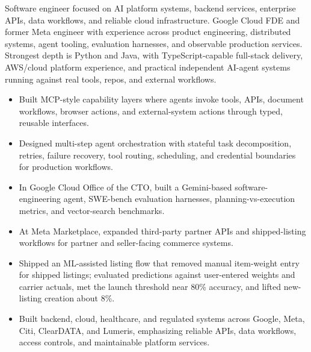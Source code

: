


Software engineer focused on AI platform systems, backend services, enterprise APIs, data workflows, and reliable cloud infrastructure. Google Cloud FDE and former Meta engineer with experience across product engineering, distributed systems, agent tooling, evaluation harnesses, and observable production services. Strongest depth is Python and Java, with TypeScript-capable full-stack delivery, AWS/cloud platform experience, and practical independent AI-agent systems running against real tools, repos, and external workflows.
\begin{itemize}
  \item Built MCP-style capability layers where agents invoke tools, APIs, document workflows, browser actions, and external-system actions through typed, reusable interfaces.
  \item Designed multi-step agent orchestration with stateful task decomposition, retries, failure recovery, tool routing, scheduling, and credential boundaries for production workflows.
  \item In Google Cloud Office of the CTO, built a Gemini-based software-engineering agent, SWE-bench evaluation harnesses, planning-vs-execution metrics, and vector-search benchmarks.
\end{itemize}
\begin{itemize}
  \item At Meta Marketplace, expanded third-party partner APIs and shipped-listing workflows for partner and seller-facing commerce systems.
  \item Shipped an ML-assisted listing flow that removed manual item-weight entry for shipped listings; evaluated predictions against user-entered weights and carrier actuals, met the launch threshold near 80\% accuracy, and lifted new-listing creation about 8\%.
  \item Built backend, cloud, healthcare, and regulated systems across Google, Meta, Citi, ClearDATA, and Lumeris, emphasizing reliable APIs, data workflows, access controls, and maintainable platform services.
\end{itemize}




